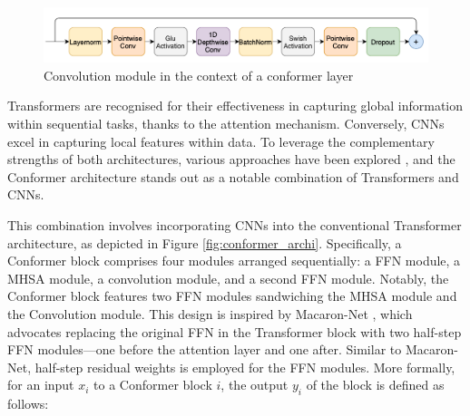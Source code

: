 \begin{figure}[h]
    \centering
    \includegraphics[width=1\textwidth]{imgs/ConvolutionModule.png}
    \caption{Convolution module in the context of a conformer layer}
    \label{fig:convModule}
\end{figure}
Transformers are recognised for their effectiveness in capturing global information within sequential tasks, thanks to the attention mechanism. Conversely, CNNs excel in capturing local features within data. To leverage the complementary strengths of both architectures, various approaches have been explored \cite{bello2019attention,yang2019convolutional}, and the Conformer architecture \cite{gulati2020conformer} stands out as a notable combination of Transformers and CNNs.

This combination involves incorporating CNNs into the conventional Transformer architecture, as depicted in Figure \ref{fig:conformer_archi}. Specifically, a Conformer block comprises four modules arranged sequentially: a FFN module, a MHSA module, a convolution module, and a second FFN module. Notably, the Conformer block features two FFN modules sandwiching the MHSA module and the Convolution module. This design is inspired by Macaron-Net \cite{lu2019understanding}, which advocates replacing the original FFN in the Transformer block with two half-step FFN modules—one before the attention layer and one after. Similar to Macaron-Net, half-step residual weights is employed for the FFN modules. More formally, for an input $x_i$ to a Conformer block $i$, the output $y_i$ of the block is defined as follows:

